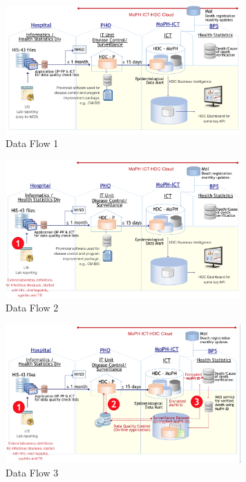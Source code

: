     \FloatBarrier
        \begin{figure}[h!]
            \centering
            	\includegraphics[width=9cm]{images/chapter-04/data_flow1.png}
            	\caption{Data Flow 1}
            	\label{fig_data_flow1}
        \end{figure}
    \FloatBarrier
    \FloatBarrier
        \begin{figure}[h!]
            \centering
            	\includegraphics[width=9cm]{images/chapter-04/data_flow2.png}
            	\caption{Data Flow 2}
            	\label{fig_data_flow2}
        \end{figure}
    \FloatBarrier
    \FloatBarrier
        \begin{figure}[h!]
            \centering
            	\includegraphics[width=9cm]{images/chapter-04/data_flow3.png}
            	\caption{Data Flow 3}
            	\label{fig_data_flow3}
        \end{figure}
